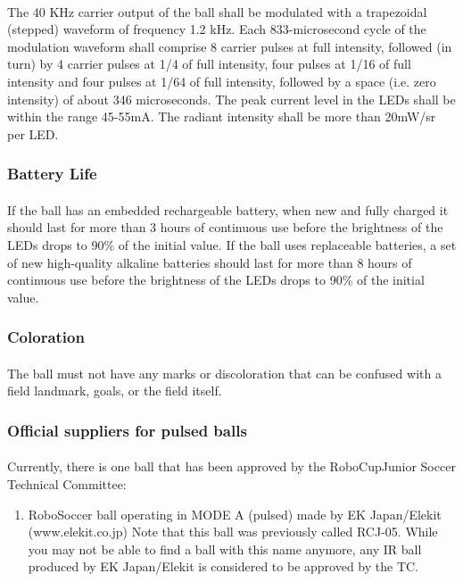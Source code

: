 \documentclass{article}
\newcommand*{\p}{\paragraph{}}
\begin{document}
\p The 40 KHz carrier output of the ball shall be modulated with a trapezoidal
(stepped) waveform of frequency 1.2 kHz. Each 833-microsecond cycle of the
modulation waveform shall comprise 8 carrier pulses at full intensity, followed
(in turn) by 4 carrier pulses at 1/4 of full intensity, four pulses at 1/16 of
full intensity and four pulses at 1/64 of full intensity, followed by a space
(i.e. zero intensity) of about 346 microseconds. The peak current level in the
LEDs shall be within the range 45-55mA. The radiant intensity shall be more
than 20mW/sr per LED.

\subsubsection{Battery Life}

\p If the ball has an embedded rechargeable battery, when new and fully charged it
should last for more than 3 hours of continuous use before the brightness of
the LEDs drops to 90\% of the initial value. If the ball uses replaceable
batteries, a set of new high-quality alkaline batteries should last for more
than 8 hours of continuous use before the brightness of the LEDs drops to 90\%
of the initial value.

\subsubsection{Coloration}

\p The ball must not have any marks or discoloration that can be confused with a field
landmark, goals, or the field itself.

\subsubsection{Official suppliers for pulsed balls}

\p Currently, there is one ball that has been approved by the RoboCupJunior Soccer
Technical Committee:

\begin{enumerate}
    \item RoboSoccer ball operating in MODE A (pulsed) made by EK Japan/Elekit (www.elekit.co.jp)
        Note that this ball was previously called RCJ-05. While
            you may not be able to find a ball with this name anymore, any IR
            ball produced by EK Japan/Elekit is considered to be approved by
            the TC.
\end{enumerate}
\end{document}
